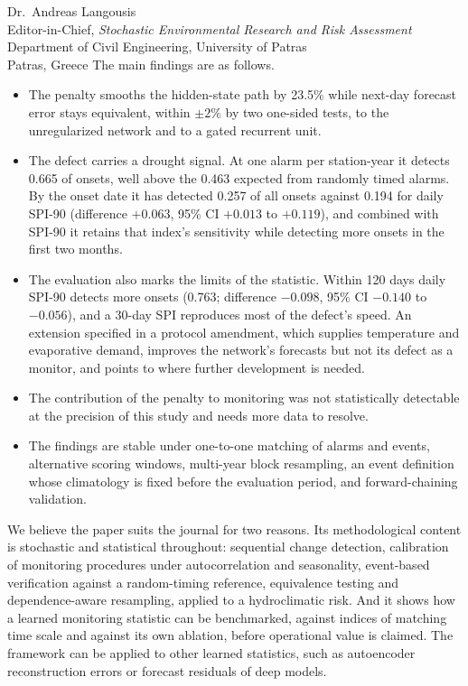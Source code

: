 \documentclass[11pt,a4paper]{letter}
\begin{document}
\begin{letter}{Dr.\ Andreas Langousis\\
Editor-in-Chief, \emph{Stochastic Environmental Research and Risk Assessment}\\
Department of Civil Engineering, University of Patras\\
Patras, Greece}
The main findings are as follows.
\begin{itemize}[leftmargin=1.5em,itemsep=2pt]
\item The penalty smooths the hidden-state path by 23.5\% while next-day forecast error stays equivalent,
within $\pm2\%$ by two one-sided tests, to the unregularized network and to a gated recurrent unit.
\item The defect carries a drought signal. At one alarm per station-year it detects 0.665 of onsets, well
above the 0.463 expected from randomly timed alarms. By the onset date it has detected 0.257 of all
onsets against 0.194 for daily SPI-90 (difference $+0.063$, 95\% CI $+0.013$ to $+0.119$), and combined
with SPI-90 it retains that index's sensitivity while detecting more onsets in the first two months.
\item The evaluation also marks the limits of the statistic. Within 120 days daily SPI-90 detects more
onsets (0.763; difference $-0.098$, 95\% CI $-0.140$ to $-0.056$), and a 30-day SPI reproduces most of the
defect's speed. An extension specified in a protocol amendment, which supplies temperature and
evaporative demand, improves the network's forecasts but not its defect as a monitor, and points to where
further development is needed.
\item The contribution of the penalty to monitoring was not statistically detectable at the precision of
this study and needs more data to resolve.
\item The findings are stable under one-to-one matching of alarms and events, alternative scoring windows,
multi-year block resampling, an event definition whose climatology is fixed before the evaluation period,
and forward-chaining validation.
\end{itemize}

We believe the paper suits the journal for two reasons. Its methodological content is stochastic and
statistical throughout: sequential change detection, calibration of monitoring procedures under
autocorrelation and seasonality, event-based verification against a random-timing reference, equivalence
testing and dependence-aware resampling, applied to a hydroclimatic risk. And it shows how a learned
monitoring statistic can be benchmarked, against indices of matching time scale and against its own
ablation, before operational value is claimed. The framework can be applied to other learned statistics,
such as autoencoder reconstruction errors or forecast residuals of deep models.


\end{letter}
\end{document}
